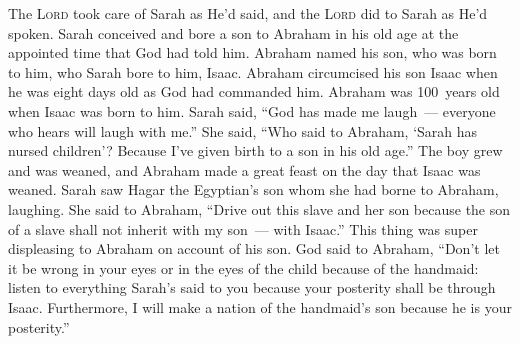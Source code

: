 
\begin{inparaenum}
     The \textsc{Lord} took care of Sarah as He'd said, and the \textsc{Lord} did to Sarah as He'd spoken.%
     Sarah conceived and bore a son to Abraham in his old age at the appointed time that God had told him.%
     Abraham named his son, who was born to him, who Sarah bore to him, Isaac.%
     Abraham circumcised his son Isaac when he was eight days old as God had commanded him.%
     Abraham was 100~years old when Isaac was born to him.%
     Sarah said, ``God has made me laugh~--- everyone who hears will laugh with me.''%
     She said, ``Who said to Abraham, `Sarah has nursed children'? Because I've given birth to a son in his old age.''%
     The boy grew and was weaned, and Abraham made a great feast on the day that Isaac was weaned.%
     Sarah saw Hagar the Egyptian's son whom she had borne to Abraham, laughing.%
     She said to Abraham, ``Drive out this slave and her son because the son of a slave shall not inherit with my son~--- with Isaac.''%
     This\understood{} thing was super displeasing to Abraham on account of his son.%
     God said to Abraham, ``Don't let it be wrong in your eyes or in the eyes of the child because of the handmaid: listen to everything Sarah's said to you because your posterity shall be through Isaac.%
     Furthermore, I will make a nation of the handmaid's son because he is your posterity.''%
\end{inparaenum}
